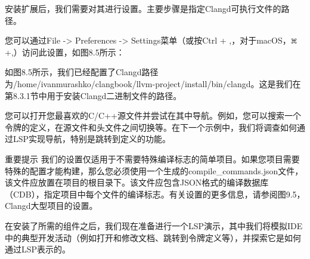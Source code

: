 
安装扩展后，我们需要对其进行设置。主要步骤是指定Clangd可执行文件的路径。

您可以通过File -> Preferences -> Settings菜单（或按Ctrl + ,，对于macOS，\includegraphics[width=0.02\textwidth]{content/part2/chapter8/images/3.png} +,）访问此设置，如图8.5所示：


如图8.5所示，我们已经配置了Clangd路径为/home/ivanmurashko/clangbook/llvm-project/install/bin/clangd。这是我们在第8.3.1节中用于安装Clangd二进制文件的路径。

您可以打开您最喜欢的C/C++源文件并尝试在其中导航。例如，您可以搜索一个令牌的定义，在源文件和头文件之间切换等。在下一个示例中，我们将调查如何通过LSP实现导航，特别是跳转到定义的功能。

\begin{myNotic}{重要提示}
我们的设置仅适用于不需要特殊编译标志的简单项目。如果您项目需要特殊的配置才能构建，那么您必须使用一个生成的compile\_commands.json文件，该文件应放置在项目的根目录下。该文件应包含JSON格式的编译数据库（CDB），指定项目中每个文件的编译标志。有关设置的更多信息，请参阅图9.5，Clangd大型项目的设置。
\end{myNotic}

在安装了所需的组件之后，我们现在准备进行一个LSP演示，其中我们将模拟IDE中的典型开发活动（例如打开和修改文档、跳转到令牌定义等），并探索它是如何通过LSP表示的。











































































